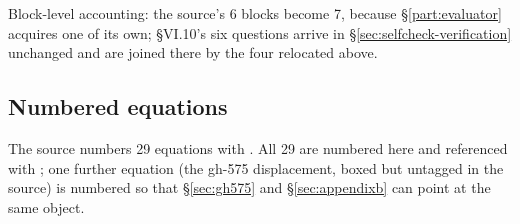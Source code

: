 Block-level accounting: the source's 6 blocks become 7, because
\S\ref{part:evaluator} acquires one of its own; \S VI.10's six questions arrive
in \S\ref{sec:selfcheck-verification} unchanged and are joined there by the four
relocated above.

\subsection{Numbered equations}
\label{app:equations}

The source numbers 29 equations with . All 29 are
numbered here and referenced with ; one further
equation (the gh-575 displacement, boxed but untagged in the source) is numbered
so that \S\ref{sec:gh575} and \S\ref{sec:appendixb} can point at the same
object.

